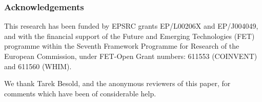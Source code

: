 \documentclass{article} %
\begin{document}




\tableofcontents

\newpage



  





\subsubsection*{Acknowledgements}
This research has been funded by EPSRC grants EP/L00206X and
EP/J004049, and with the financial support of the Future and Emerging
Technologies (FET) programme within the Seventh Framework Programme
for Research of the European Commission, under FET-Open Grant numbers:
611553 (COINVENT) and 611560 (WHIM).

We thank Tarek Besold, and the anonymous reviewers of this paper, for
comments which have been of considerable help.




% 
\end{document}
